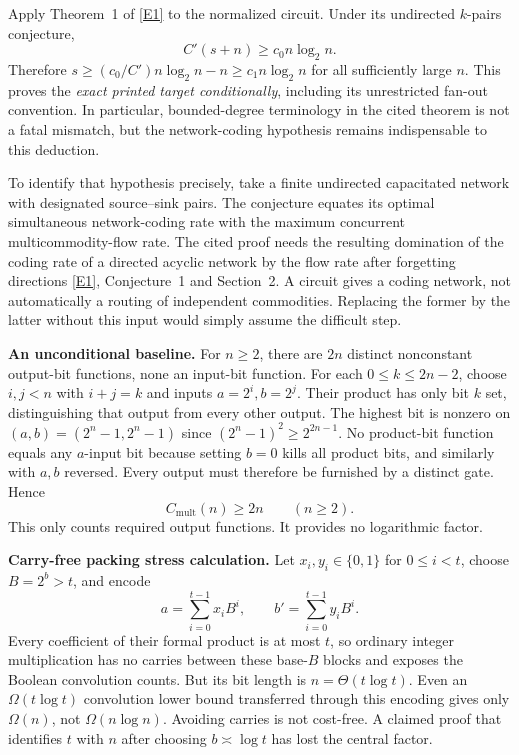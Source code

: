 \documentclass[11pt,a4paper]{article}
\newcommand{\eref}[2]{\hyperlink{extra:#1:#2}{[E#2]}}
\numberwithin{equation}{section}
\begin{document}
Apply Theorem~1 of \eref{189}{1} to the normalized circuit. Under its undirected $k$-pairs conjecture,
\[
 C'(s+n)\ge c_0 n\log_2n.
\]
Therefore $s\ge(c_0/C')n\log_2n-n\ge c_1n\log_2n$ for all sufficiently large $n$. This proves the \emph{exact printed target conditionally}, including its unrestricted fan-out convention. In particular, bounded-degree terminology in the cited theorem is not a fatal mismatch, but the network-coding hypothesis remains indispensable to this deduction.

To identify that hypothesis precisely, take a finite undirected capacitated network with designated source--sink pairs. The conjecture equates its optimal simultaneous network-coding rate with the maximum concurrent multicommodity-flow rate. The cited proof needs the resulting domination of the coding rate of a directed acyclic network by the flow rate after forgetting directions \eref{189}{1}, Conjecture~1 and Section~2. A circuit gives a coding network, not automatically a routing of independent commodities. Replacing the former by the latter without this input would simply assume the difficult step.

\textbf{An unconditional baseline.} For $n\ge2$, there are $2n$ distinct nonconstant output-bit functions, none an input-bit function. For each $0\le k\le2n-2$, choose $i,j<n$ with $i+j=k$ and inputs $a=2^i,b=2^j$. Their product has only bit $k$ set, distinguishing that output from every other output. The highest bit is nonzero on $(a,b)=(2^n-1,2^n-1)$ since $(2^n-1)^2\ge2^{2n-1}$. No product-bit function equals any $a$-input bit because setting $b=0$ kills all product bits, and similarly with $a,b$ reversed. Every output must therefore be furnished by a distinct gate. Hence
\[
 C_{\mathrm{mult}}(n)\ge2n\qquad(n\ge2).
\]
This only counts required output functions. It provides no logarithmic factor.

\textbf{Carry-free packing stress calculation.} Let $x_i,y_i\in\{0,1\}$ for $0\le i<t$, choose $B=2^b>t$, and encode
\[
 a=\sum_{i=0}^{t-1}x_iB^i,\qquad b'=\sum_{i=0}^{t-1}y_iB^i.
\]
Every coefficient of their formal product is at most $t$, so ordinary integer multiplication has no carries between these base-$B$ blocks and exposes the Boolean convolution counts. But its bit length is $n=\Theta(t\log t)$. Even an $\Omega(t\log t)$ convolution lower bound transferred through this encoding gives only $\Omega(n)$, not $\Omega(n\log n)$. Avoiding carries is not cost-free. A claimed proof that identifies $t$ with $n$ after choosing $b\asymp\log t$ has lost the central factor.
\end{document}
